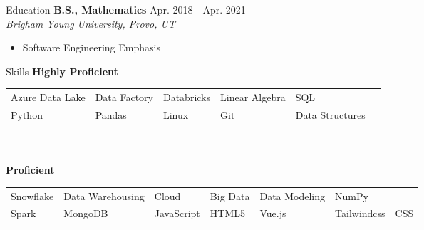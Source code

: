 \documentclass{resume} %
\begin{document}
\begin{rSection}{Education}
{\bf B.S., Mathematics }\hfill {Apr. 2018 - Apr. 2021} \\
\textit{Brigham Young University, Provo, UT}
\begin{itemize}
    \item Software Engineering Emphasis
\end{itemize}
\end{rSection}

\begin{rSection}{Skills}
    \textbf{Highly Proficient}\\
        \begin{tabular}{ l l l l l l }
            Azure Data Lake & Data Factory & Databricks & Linear Algebra & SQL \\
            Python & Pandas & Linux & Git & Data Structures  
        \end{tabular}\\\\
    \textbf{Proficient}\\
        \begin{tabular}{ l l l l l l l }
            Snowflake & Data Warehousing & Cloud & Big Data & Data Modeling & NumPy \\
            Spark & MongoDB & JavaScript & HTML5 & Vue.js &  Tailwindcss & CSS
        \end{tabular}
\end{rSection}
\end{document}
